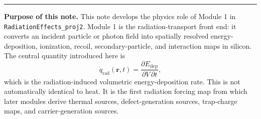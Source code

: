 \documentclass[11pt]{article}
\newcommand{\Edep}{E_{\mathrm{dep}}}
\newcommand{\qrad}{\dot{q}_{\mathrm{rad}}}
\newcommand{\rpos}{\mathbf{r}}
\begin{document}

\hrule
\vspace{0.8em}

\begin{overviewbox}
\textbf{Purpose of this note.} This note develops the physics role of Module 1 in \texttt{RadiationEffects\_proj2}. Module 1 is the radiation-transport front end: it converts an incident particle or photon field into spatially resolved energy-deposition, ionization, recoil, secondary-particle, and interaction maps in silicon. The central quantity introduced here is
\begin{equation*}
\qrad(\rpos,t) = \frac{\partial \Edep}{\partial V\,\partial t},
\end{equation*}
which is the radiation-induced volumetric energy-deposition rate. This is not automatically identical to heat. It is the first radiation forcing map from which later modules derive thermal sources, defect-generation sources, trap-charge maps, and carrier-generation sources.
\end{overviewbox}

\ProjectTOC

\SymbolsAcronymsSection
\end{document}
